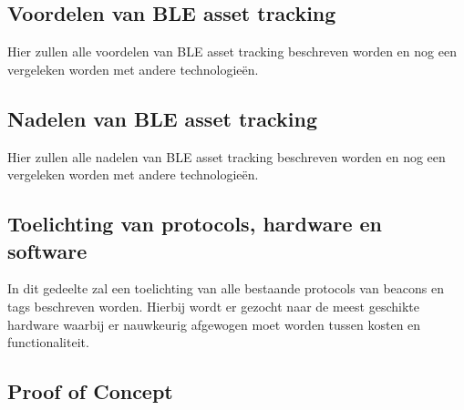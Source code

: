 
\subsection{Voordelen van BLE asset tracking}
Hier zullen alle voordelen van BLE asset tracking beschreven worden en nog een vergeleken worden met andere technologieën.
\subsection{Nadelen van BLE asset tracking}
Hier zullen alle nadelen van BLE asset tracking beschreven worden en nog een vergeleken worden met andere technologieën.
\subsection{Toelichting van protocols, hardware en software}
In dit gedeelte zal een toelichting van alle bestaande protocols van beacons en tags beschreven worden. Hierbij wordt er gezocht naar de meest geschikte hardware waarbij er nauwkeurig afgewogen moet worden tussen kosten en functionaliteit. 
\subsection{Proof of Concept}


